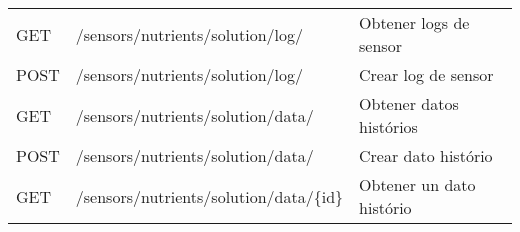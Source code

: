 \begin{table}[H]
\begin{tabular}{l l l}
        GET             & /sensors/nutrients/solution/log/        & Obtener logs de sensor   \\
        POST            & /sensors/nutrients/solution/log/        & Crear log de sensor      \\
        \midrule
        GET             & /sensors/nutrients/solution/data/       & Obtener datos histórios  \\
        POST            & /sensors/nutrients/solution/data/       & Crear dato histório      \\
        GET             & /sensors/nutrients/solution/data/\{id\} & Obtener un dato histório \\
        \bottomrule
        \hline
    \end{tabular}
    \label{tab:endpoints3}
\end{table}